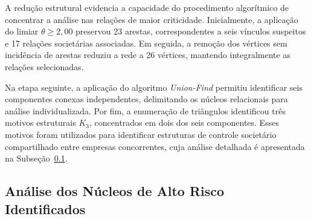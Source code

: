 \begin{table}[!h]
  \centering
  \caption{Evolução Métrica do Pipeline de Redução Topológica}
  \label{tab:reducao_topologica}
\end{table}

A redução estrutural evidencia a capacidade do procedimento algorítmico de concentrar a análise nas relações de maior criticidade. Inicialmente, a aplicação do limiar $\theta \geq 2{,}00$ preservou 23 arestas, correspondentes a seis vínculos suspeitos e 17 relações societárias associadas. Em seguida, a remoção dos vértices sem incidência de arestas reduziu a rede a 26 vértices, mantendo integralmente as
relações selecionadas.

Na etapa seguinte, a aplicação do algoritmo \textit{Union-Find} permitiu identificar seis componentes conexas independentes, delimitando os núcleos relacionais para análise individualizada. Por fim, a enumeração de triângulos identificou três motivos estruturais $K_3$, concentrados em dois dos seis componentes. Esses motivos foram utilizados para identificar estruturas de controle societário compartilhado entre empresas concorrentes, cuja análise detalhada é apresentada na Subseção~\ref{subsec:nucleos_alto_risco}.



\subsection{Análise dos Núcleos de Alto Risco Identificados}
\label{subsec:nucleos_alto_risco}

